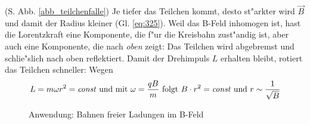 \begin{Beispiel}
\begin{description}[\setlabelstyle{\bfseries\slshape}]
   (S. Abb. \ref{abb_teilchenfalle}) Je tiefer das Teilchen kommt,
   desto st"arkter wird $\vec B$ und damit der Radius kleiner
   (Gl. \eqref{eq:325}). Weil das B-Feld inhomogen ist, hast die
   Lorentzkraft eine Komponente, die f"ur die Kreisbahn zust"andig ist,
   aber auch eine Komponente, die nach \emph{oben} zeigt: Das Teilchen
   wird abgebremst und schlie"slich nach oben reflektiert. Damit der
   Drehimpuls $L$ erhalten bleibt, rotiert das Teilchen schneller: Wegen
   \begin{equation*}
      L = m\omega r^2 = \text{\emph{const}} \text{ und mit } \omega =
      \frac{qB}{m} \text{ folgt } B \cdot r^2 = \text{\emph{const}} \text{ und } r
      \sim \frac{1}{\sqrt{B}}
   \end{equation*}
\end{description}
\end{Beispiel}


\begin{figure}
   \centering
\caption[Bahnen freier Ladungen im B-Feld]{Anwendung: Bahnen freier
  Ladungen im B-Feld}
   \label{abb_bahnen-im-bfled}
\end{figure}

















